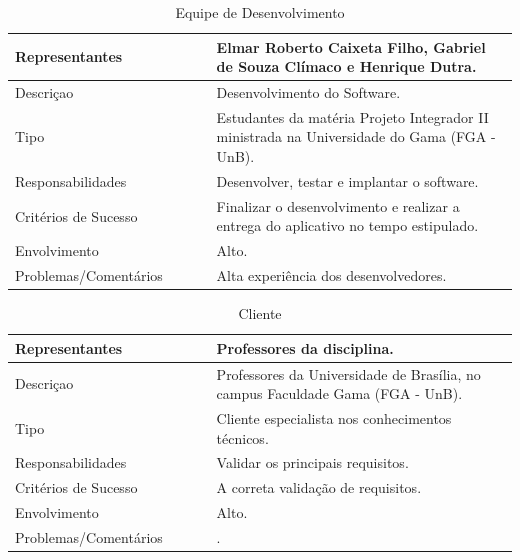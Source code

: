 \begin{table}[htp]
    \centering
    \caption{Equipe de Desenvolvimento}
    \label{my-label}
    \begin{tabular}{|p{0.40\linewidth}|p{0.60\linewidth}|}
        \hline
        Representantes    & Elmar Roberto Caixeta Filho, Gabriel de Souza Clímaco e Henrique Dutra. \\ \hline
        Descriçao    & Desenvolvimento do Software. \\ \hline
        Tipo    & Estudantes da matéria Projeto Integrador II ministrada na Universidade do Gama (FGA - UnB). \\ \hline
        Responsabilidades    & Desenvolver, testar e implantar o software. \\ \hline
        Critérios de Sucesso    & Finalizar o desenvolvimento e realizar a entrega do aplicativo no tempo estipulado. \\ \hline
        Envolvimento    & Alto. \\ \hline
        Problemas/Comentários    & Alta experiência dos desenvolvedores. \\ \hline
    \end{tabular}
\end{table}


\begin{table}[htp]
    \centering
    \caption{Cliente}
    \label{my-label}
    \begin{tabular}{|p{0.40\linewidth}|p{0.60\linewidth}|}
        \hline
        Representantes    & Professores da disciplina. \\ \hline
        Descriçao    & Professores da Universidade de Brasília, no campus Faculdade Gama (FGA - UnB). \\ \hline
        Tipo    &  Cliente especialista nos conhecimentos técnicos. \\ \hline
        Responsabilidades    & Validar os principais requisitos.  \\ \hline
        Critérios de Sucesso    & A correta validação de requisitos. \\ \hline
        Envolvimento    & Alto. \\ \hline
        Problemas/Comentários    & . \\ \hline
    \end{tabular}
\end{table}


